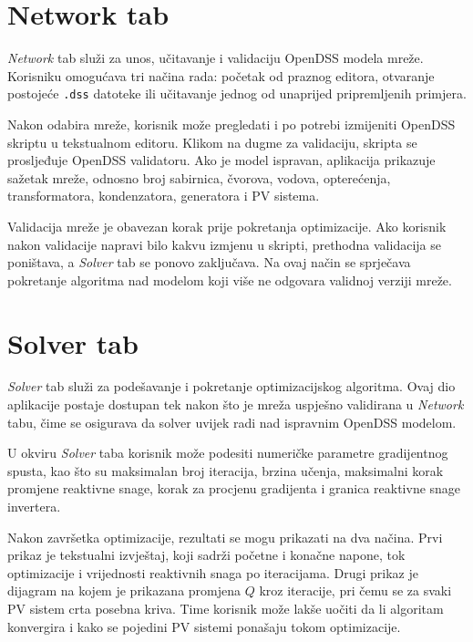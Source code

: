 \documentclass[12pt,oneside, a4paper]{book}
\begin{document}
\section{Network tab}

\textit{Network} tab služi za unos, učitavanje i validaciju OpenDSS modela mreže. Korisniku omogućava tri načina rada: početak od praznog editora, otvaranje postojeće \texttt{.dss} datoteke ili učitavanje jednog od unaprijed pripremljenih primjera.

Nakon odabira mreže, korisnik može pregledati i po potrebi izmijeniti OpenDSS skriptu u tekstualnom editoru. Klikom na dugme za validaciju, skripta se prosljeđuje OpenDSS validatoru. Ako je model ispravan, aplikacija prikazuje sažetak mreže, odnosno broj sabirnica, čvorova, vodova, opterećenja, transformatora, kondenzatora, generatora i PV sistema.

Validacija mreže je obavezan korak prije pokretanja optimizacije. Ako korisnik nakon validacije napravi bilo kakvu izmjenu u skripti, prethodna validacija se poništava, a \textit{Solver} tab se ponovo zaključava. Na ovaj način se sprječava pokretanje algoritma nad modelom koji više ne odgovara validnoj verziji mreže.

\section{Solver tab}

\textit{Solver} tab služi za podešavanje i pokretanje optimizacijskog algoritma. Ovaj dio aplikacije postaje dostupan tek nakon što je mreža uspješno validirana u \textit{Network} tabu, čime se osigurava da solver uvijek radi nad ispravnim OpenDSS modelom.

U okviru \textit{Solver} taba korisnik može podesiti numeričke parametre gradijentnog spusta, kao što su maksimalan broj iteracija, brzina učenja, maksimalni korak promjene reaktivne snage, korak za procjenu gradijenta i granica reaktivne snage invertera.

Nakon završetka optimizacije, rezultati se mogu prikazati na dva načina. Prvi prikaz je tekstualni izvještaj, koji sadrži početne i konačne napone, tok optimizacije i vrijednosti reaktivnih snaga po iteracijama. Drugi prikaz je dijagram na kojem je prikazana promjena $Q$ kroz iteracije, pri čemu se za svaki PV sistem crta posebna kriva. Time korisnik može lakše uočiti da li algoritam konvergira i kako se pojedini PV sistemi ponašaju tokom optimizacije.
\end{document}
